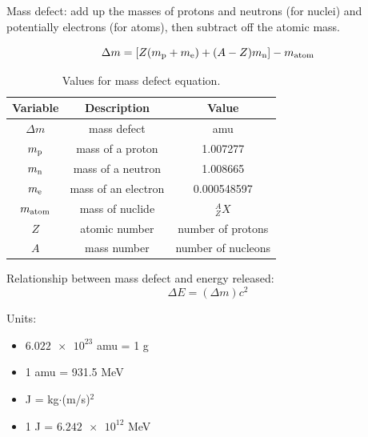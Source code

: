 \documentclass[10pt]{article}
\begin{document}
Mass defect: add up the masses of protons and neutrons (for nuclei) and potentially electrons (for atoms), then subtract off the atomic mass.

\begin{equation*}
\Delta m = [Z(m_{\textnormal{p}}+m_\textnormal{e})+(A-Z)m_\textnormal{n}]-m_\textnormal{atom}
\end{equation*}

\begin{table}[H]
    \centering
    \caption{Values for mass defect equation.}
        \begin{tabular}{ccc}
            \toprule
               Variable & Description & Value \\
               \midrule
               $\Delta m$ & mass defect & amu \\
               $m_\textnormal{p}$ & mass of a proton & 1.007277 \\
               $m_\textnormal{n}$ & mass of a neutron & 1.008665 \\
               $m_\textnormal{e}$ & mass of an electron & 0.000548597 \\
               $m_\textnormal{atom}$ & mass of nuclide & $^A_Z X$\\
               $Z$ & atomic number & number of protons \\
               $A$ & mass number & number of nucleons \\
            \bottomrule
        \end{tabular}
    \label{tabgrav}
\end{table}

Relationship between mass defect and energy released: 
\begin{equation*}
\Delta E = (\Delta m)c^2
\end{equation*}

Units:

\begin{itemize}
    \item $\num{6.022e23}$ amu = 1 g
    \item 1 amu = 931.5 MeV
    \item J = kg$\cdot$(m/s)$^{2}$
    \item 1 J = $\num{6.242e12}$ MeV
\end{itemize}


\end{document}
